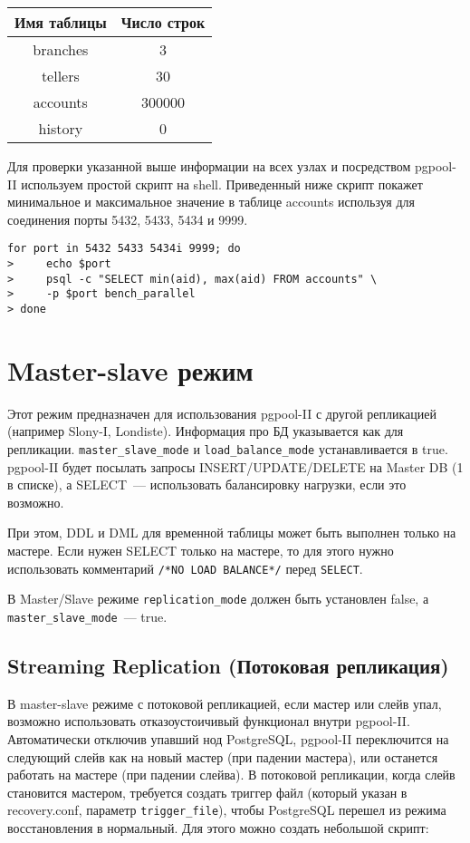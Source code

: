 \begin{tabular}{ | c | c | }
  \hline
  Имя таблицы & Число строк \\
  \hline
  branches & 3 \\
  \hline
  tellers & 30 \\
  \hline
  accounts & 300000 \\
  \hline
  history & 0 \\
  \hline
\end{tabular}

Для проверки указанной выше информации на всех узлах и посредством pgpool-II используем простой скрипт на shell. Приведенный ниже скрипт покажет минимальное и максимальное значение в таблице accounts используя для соединения порты 5432, 5433, 5434 и 9999.

\begin{lstlisting}[label=lst:pgpool39,caption=Проверка параллельного запроса]
for port in 5432 5433 5434i 9999; do
>     echo $port
>     psql -c "SELECT min(aid), max(aid) FROM accounts" \
>     -p $port bench_parallel
> done
\end{lstlisting}


\section{Master-slave режим}

Этот режим предназначен для использования pgpool-II с другой репликацией (например Slony-I, Londiste). Информация про БД указывается как для репликации. \lstinline!master_slave_mode! и \lstinline!load_balance_mode! устанавливается в true. pgpool-II будет посылать запросы INSERT/UPDATE/DELETE на Master DB (1 в списке), а SELECT~--- использовать балансировку нагрузки, если это возможно.

При этом, DDL и DML для временной таблицы может быть выполнен только на мастере. Если нужен SELECT только на мастере, то для этого нужно использовать комментарий \lstinline!/*NO LOAD BALANCE*/! перед \lstinline!SELECT!.

В Master/Slave режиме \lstinline!replication_mode! должен быть установлен false, а \lstinline!master_slave_mode!~--- true.

\subsection{Streaming Replication (Потоковая репликация)}

В master-slave режиме с потоковой репликацией, если мастер или слейв упал, возможно использовать отказоустоичивый функционал внутри pgpool-II. Автоматически отключив упавший нод PostgreSQL, pgpool-II переключится на следующий слейв как на новый мастер (при падении мастера), или останется работать на мастере (при падении слейва). В потоковой репликации, когда слейв становится мастером, требуется создать триггер файл (который указан в recovery.conf, параметр \lstinline!trigger_file!), чтобы PostgreSQL перешел из режима
восстановления в нормальный. Для этого можно создать небольшой скрипт:

